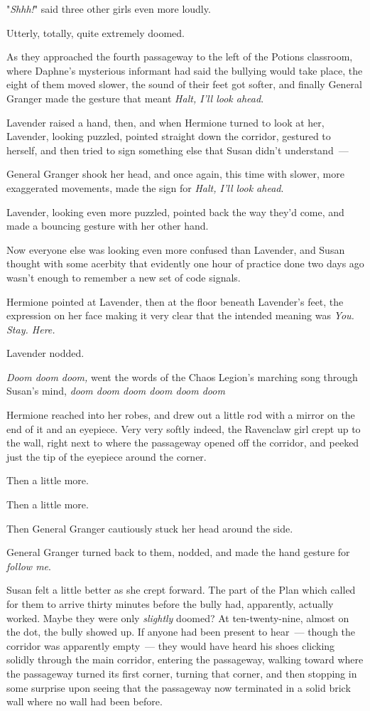 "\emph{Shhh!}" said three other girls even more loudly.

Utterly, totally, quite extremely doomed.

As they approached the fourth passageway to the left of the Potions classroom,
where Daphne's mysterious informant had said the bullying would take place, the
eight of them moved slower, the sound of their feet got softer, and finally
General Granger made the gesture that meant \emph{Halt, I'll look ahead}.

Lavender raised a hand, then, and when Hermione turned to look at her,
Lavender, looking puzzled, pointed straight down the corridor, gestured to
herself, and then tried to sign something else that Susan didn't understand~---

General Granger shook her head, and once again, this time with slower, more
exaggerated movements, made the sign for \emph{Halt, I'll look ahead}.

Lavender, looking even more puzzled, pointed back the way they'd come, and made
a bouncing gesture with her other hand.

Now everyone else was looking even more confused than Lavender, and Susan
thought with some acerbity that evidently one hour of practice done two days
ago wasn't enough to remember a new set of code signals.

Hermione pointed at Lavender, then at the floor beneath Lavender's feet, the
expression on her face making it very clear that the intended meaning was
\emph{You. Stay. Here.}

Lavender nodded.

\emph{Doom doom doom,} went the words of the Chaos Legion's marching song
through Susan's mind, \emph{doom doom doom doom doom doom}{\el}

Hermione reached into her robes, and drew out a little rod with a mirror on the
end of it and an eyepiece. Very very softly indeed, the Ravenclaw girl crept up
to the wall, right next to where the passageway opened off the corridor, and
peeked just the tip of the eyepiece around the corner.

Then a little more.

Then a little more.

Then General Granger cautiously stuck her head around the side.

General Granger turned back to them, nodded, and made the hand gesture for
\emph{follow me}.

Susan felt a little better as she crept forward. The part of the Plan which
called for them to arrive thirty minutes before the bully had, apparently,
actually worked. Maybe they were only \emph{slightly} doomed\el?
\sbreak
At ten-twenty-nine, almost on the dot, the bully showed up. If anyone had been
present to hear~--- though the corridor was apparently empty~--- they would have
heard his shoes clicking solidly through the main corridor, entering the
passageway, walking toward where the passageway turned its first corner,
turning that corner, and then stopping in some surprise upon seeing that the
passageway now terminated in a solid brick wall where no wall had been before.

